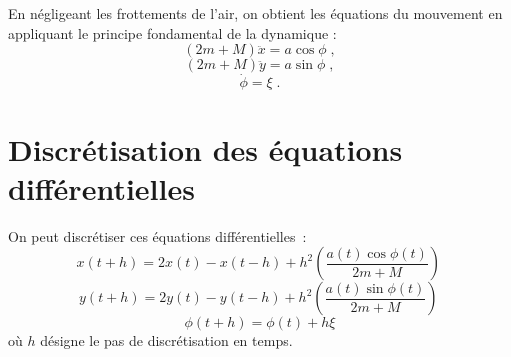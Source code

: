 \documentclass[a4paper,11pt]{amsart}
\begin{document}
En n\'egligeant les frottements de l'air, on obtient les \'equations du mouvement en appliquant le principe fondamental de la dynamique :
$$(2m+M)\ddot{x} = a\cos\phi\;,$$
$$(2m+M)\ddot{y} = a\sin\phi\;,$$
$$\dot{\phi} = \xi\;.$$


\section{Discr\'etisation des \'equations diff\'erentielles}
On peut discr\'etiser ces \'equations diff\'erentielles~:
$$x(t+h) = 2x(t)-x(t-h)+h^2\left(\frac{a(t)\cos\phi(t)}{2m+M}\right)\,$$
$$y(t+h) = 2y(t)-y(t-h)+h^2\left(\frac{a(t)\sin\phi(t)}{2m+M}\right)\,$$
$$\phi(t+h) = \phi(t)+h\xi$$
o\`u $h$ d\'esigne le pas de discr\'etisation en temps.
\end{document}
